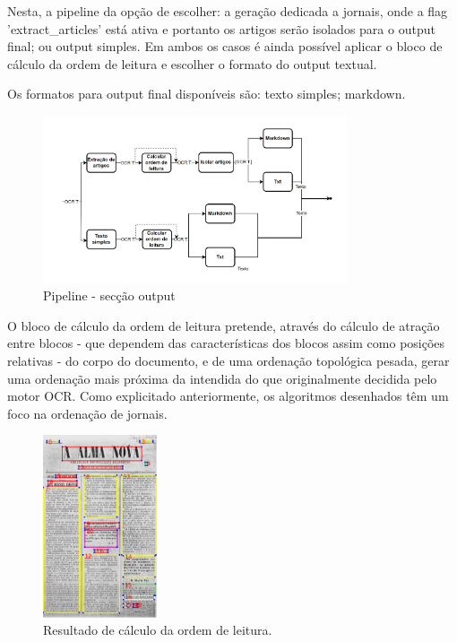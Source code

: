 Nesta, a pipeline da opção de escolher: a geração dedicada a jornais, onde a flag 'extract\_articles' está ativa e portanto os artigos serão isolados para o output final; ou output simples. Em ambos os casos é ainda possível aplicar o bloco de cálculo da ordem de leitura e escolher o formato do output textual.

Os formatos para output final disponíveis são: texto simples; markdown.

\begin{figure}[H]
	\centering
	\includegraphics[width=0.8\textwidth]{images/diagramas/arquitetura_pipeline_output.png}
	\caption{Pipeline - secção output}
	\label{fig:arquitetura_pipeline_output}
\end{figure}




O bloco de cálculo da ordem de leitura pretende, através do cálculo de atração entre blocos - que dependem das características dos blocos assim como posições relativas - do corpo do documento, e de uma ordenação topológica pesada, gerar uma ordenação mais próxima da intendida do que originalmente decidida pelo motor OCR. Como explicitado anteriormente, os algoritmos desenhados têm um foco na ordenação de jornais.


\begin{figure}[H]
	\centering
	\includegraphics[width=0.3\textwidth]{images/ilustracoes/pipeline_calculate_reading_order_example.png}
	\caption{Resultado de cálculo da ordem de leitura.}
	\label{fig:pipeline_calculate_reading_order_example}
\end{figure}

